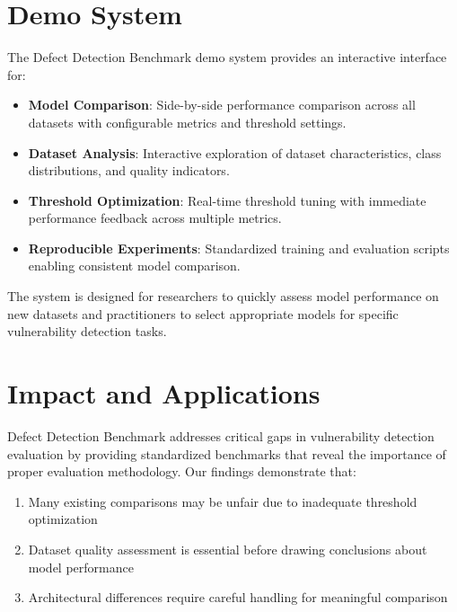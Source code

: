 \documentclass[letterpaper]{article}
\begin{document}
\section{Demo System}

The Defect Detection Benchmark demo system provides an interactive interface for:

\begin{itemize}
	\item \textbf{Model Comparison}: Side-by-side performance comparison across all datasets with configurable metrics and threshold settings.

	\item \textbf{Dataset Analysis}: Interactive exploration of dataset characteristics, class distributions, and quality indicators.

	\item \textbf{Threshold Optimization}: Real-time threshold tuning with immediate performance feedback across multiple metrics.

	\item \textbf{Reproducible Experiments}: Standardized training and evaluation scripts enabling consistent model comparison.

\end{itemize}

The system is designed for researchers to quickly assess model performance on new datasets and practitioners to select appropriate models for specific vulnerability detection tasks.

\section{Impact and Applications}

Defect Detection Benchmark addresses critical gaps in vulnerability detection evaluation by providing standardized benchmarks that reveal the importance of proper evaluation methodology. Our findings demonstrate that:

\begin{enumerate}
	\item Many existing comparisons may be unfair due to inadequate threshold optimization
	\item Dataset quality assessment is essential before drawing conclusions about model performance
	\item Architectural differences require careful handling for meaningful comparison
\end{enumerate}
\end{document}
